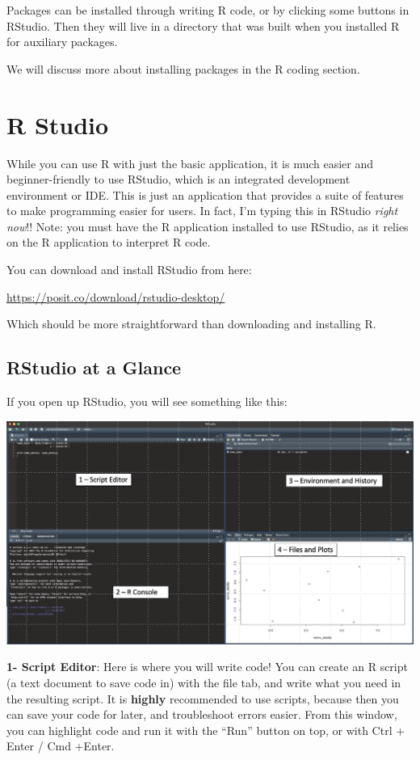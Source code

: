 \documentclass[
  letterpaper,
  DIV=11,
  numbers=noendperiod]{scrreprt}
\begin{document}
Packages can be installed through writing R code, or by clicking some
buttons in RStudio. Then they will live in a directory that was built
when you installed R for auxiliary packages.

We will discuss more about installing packages in the R coding section.

\chapter{R Studio}\label{r-studio}

While you can use R with just the basic application, it is much easier
and beginner-friendly to use RStudio, which is an integrated development
environment or IDE. This is just an application that provides a suite of
features to make programming easier for users. In fact, I'm typing this
in RStudio \emph{right now}!! Note: you must have the R application
installed to use RStudio, as it relies on the R application to interpret
R code.

You can download and install RStudio from here:

\url{https://posit.co/download/rstudio-desktop/}

Which should be more straightforward than downloading and installing R.

\section{RStudio at a Glance}\label{rstudio-at-a-glance}

If you open up RStudio, you will see something like this:

\includegraphics{rstudiowindow.png}

\textbf{1- Script Editor}: Here is where you will write code! You can
create an R script (a text document to save code in) with the file tab,
and write what you need in the resulting script. It is \textbf{highly}
recommended to use scripts, because then you can save your code for
later, and troubleshoot errors easier. From this window, you can
highlight code and run it with the ``Run'' button on top, or with Ctrl +
Enter / Cmd +Enter.
\end{document}

